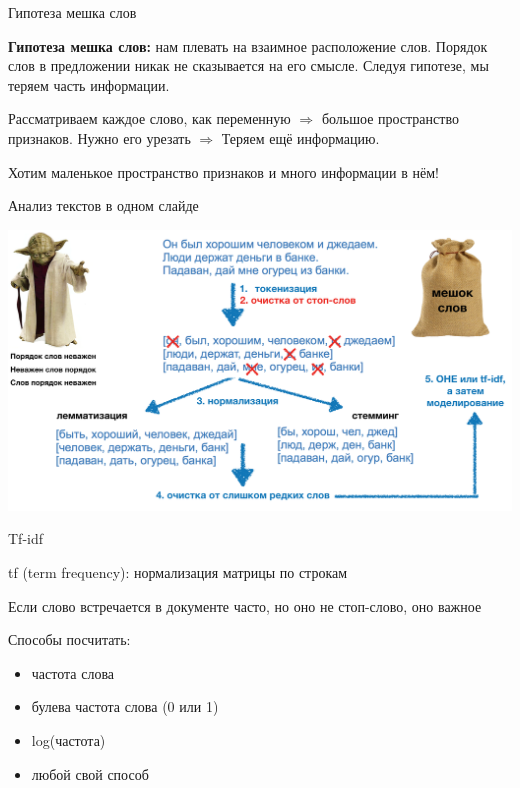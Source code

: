 \documentclass[notes,12pt, aspectratio=169]{beamer}
\newenvironment{wideitemize}{\itemize\addtolength{\itemsep}{10pt}}{\enditemize}
\begin{document}
\begin{frame}{Гипотеза мешка слов}
	\begin{wideitemize} 
		\item \textbf{Гипотеза мешка слов:} нам плевать на взаимное расположение слов. Порядок слов в предложении никак не сказывается на его смысле. 	{\color{red}  Следуя гипотезе, мы теряем часть информации.}
		
		\item Рассматриваем каждое слово, как переменную $\Rightarrow$ большое пространство признаков. Нужно его урезать $\Rightarrow$ 	{\color{red}  Теряем ещё информацию.}
		
		\item Хотим маленькое пространство признаков и много информации в нём!
	\end{wideitemize}
\end{frame} 


\begin{frame}{Анализ текстов в одном слайде}
\begin{center}
	\includegraphics[width=.95\linewidth]{classic_text.png}
\end{center}
\end{frame} 


\begin{frame}{Tf-idf}
	\begin{wideitemize} 
		\item  \alert{tf (term frequency):} нормализация матрицы по строкам
		
		\item Если слово встречается в документе часто, но оно не стоп-слово, оно важное
		
		\item  Способы посчитать: 
		\begin{itemize}
			\item  частота слова 
			
			\item  булева частота слова (0 или 1)
			
			\item  log(частота)
			
			\item  любой свой способ
		\end{itemize}
	\end{wideitemize}
\end{frame} 
\end{document}
